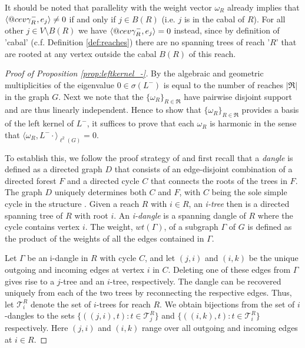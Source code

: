 \documentclass[reqno,12pt,letterpaper]{amsart}
\makeatletter
\numberwithin{equation}{section}
\newcommand{\Lin}{L^{-}}
\DeclareRobustCommand{\cev}[1]{%
	\mathpalette\do@cev{#1}%
}
\newcommand{\do@cev}[2]{%
	\fix@cev{#1}{+}%
	\reflectbox{$\m@th#1\vec{\reflectbox{$\fix@cev{#1}{-}\m@th#1#2\fix@cev{#1}{+}$}}$}%
	\fix@cev{#1}{-}%
}
\newcommand{\fix@cev}[2]{%
	\ifx#1\displaystyle
	\mkern#23mu
	\else
	\ifx#1\textstyle
	\mkern#23mu
	\else
	\ifx#1\scriptstyle
	\mkern#22mu
	\else
	\mkern#22mu
	\fi
	\fi
	\fi
}
\newcommand{\1}{\mathds{1}}
\theoremstyle{definition}
\makeatother
\begin{document}
It should be noted that parallelity with the weight vector $\omega_R$ already implies that $	\langle \cev \gamma^{-}_{R}, e_j \rangle \neq 0 $ if and only if $j \in B(R)$ (i.e. $j$ is in the cabal of  $R$). For all other $j \in V \setminus  B(R)$ we have $	\langle \cev \gamma^{-}_{R}, e_j \rangle = 0 $ instead, since by definition of
 'cabal' (c.f. Definition \ref{def:reaches}) there are no spanning trees of reach '$R$' that are rooted at any vertex outside the cabal $B(R)$ of this reach. 
\begin{proof}[Proof of Proposition \ref{prop:leftkernel_-}]
By \cite[Theorem 4.6]{Veerman2020APO} the algebraic and geometric multiplicities of the eigenvalue $0 \in \sigma(\Lin)$ is equal to the number of reaches   $|\mathfrak{R}|$ in the graph $G$. Next we note that the $\{\omega_R\}_{R \in \mathfrak{R}}$ have pairwise disjoint support and are thus linearly independent. Hence to show that $\{\omega_R\}_{R \in \mathfrak{R}}$ provides a basis of the left kernel of $\Lin$, it suffices to prove that each $\omega_R$ is harmonic in the sense that $\langle \omega_R, \Lin \cdot \rangle_{\ell^2(G)} = 0$.



To establish this, we follow the proof strategy of \cite[Theorem 1]{sahi2014harmonic} and first recall that a \textit{dangle} is defined as a directed graph $D$ that consists of an edge-disjoint combination of a directed forest $F$ and a directed cycle $C$ that connects the roots of the trees in $F$. The graph $D$ uniquely determines both $C$ and $F$, with $C$ being the sole simple cycle in the structure \cite{sahi2014harmonic}. Given a reach $R$ with $i \in R$, an  \textit{i-tree} then is a directed spanning tree of $R$ with root $i$.  An \textit{i-dangle} is a spanning dangle of $R$ where the cycle contains vertex $i$. 
The weight, $wt(\Gamma)$, of a subgraph $\Gamma$ of $G$ is defined as the product of the weights of all the edges contained in $\Gamma$.


\medskip 

Let $\Gamma$ be an i-dangle in $R$ with cycle $C$, and let $(j,i)$ and $(i,k)$ be the unique outgoing and incoming edges at vertex $i$ in $C$. Deleting one of these edges from $\Gamma$ gives rise to a $j$-tree and an $i$-tree, respectively. The dangle can be recovered uniquely from each of the two trees by reconnecting the respective edges. Thus, let $\mathcal{T}^R_i$ denote the set of $i$-trees for reach $R$. We obtain bijections from the set of $i$-dangles to the sets
$
\{ ((j,i), t) : t \in \mathcal{T}^R_j \}$ and $ \{ ((i,k), t) : t \in \mathcal{T}^R_i \}$ respectively.
Here $(j,i)$ and $(i,k)$ range over all outgoing and incoming edges at $i \in R$.


\end{proof}
\end{document}
